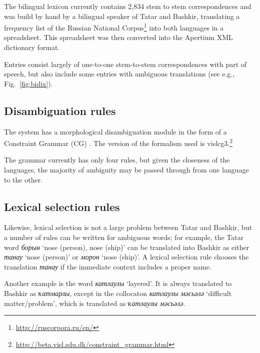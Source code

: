 \documentclass[11pt]{article}
\begin{document}
The bilingual lexicon currently contains 2,834 stem to stem correspondences and was build by hand by a bilingual 
speaker of Tatar and Bashkir, translating a frequency list of the Russian National Corpus\footnote{\url{http://ruscorpora.ru/en/}} into both languages in a spreadsheet. This spreadsheet was then converted into the Apertium
XML dictionary format. 

Entries consist largely of one-to-one stem-to-stem correspondences with part of speech, but also
include some entries with ambiguous translations (see e.g., Fig.~\ref{fig:bidix}).

\subsection{Disambiguation rules}

The system has a morphological disambiguation module in the form of a 
Constraint Grammar (CG) \citep{karlsson95}. The version of the formalism used is 
vislcg3.\footnote{\url{http://beta.visl.sdu.dk/constraint_grammar.html}}

The grammar currently has only four rules, but given the closeness of the languages, the 
majority of ambiguity may be passed through from one language to the other.

\subsection{Lexical selection rules}

Likewise, lexical selection is not a large problem between Tatar and Bashkir, but a 
number of rules can be written for ambiguous words; for example, the Tatar 
word \emph{борын} `nose (person), nose (ship)' can be translated into Bashkir 
as either \emph{танау} `nose (person)' or \emph{морон} `nose (ship)'. A lexical selection
rule chooses the translation \emph{танау} if the immediate context includes a proper 
name.

Another example is the word \emph{катлаулы} `layered'.  It is always translated to Bashkir 
as \emph{{\qipa ҡ}атмарлы}, except in the collocaton \emph{катлаулы мәсьәлә} `difficult matter/problem', which is translated as \emph{{\qipa ҡ}атлаулы мәсьәлә}.

\end{document}
